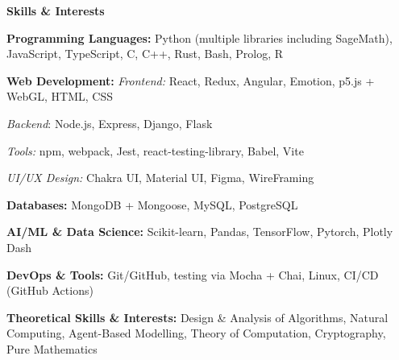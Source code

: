 \documentclass[12pt, a4paper]{article}
\begin{document}
\newpage
\begin{center}
	\large\textbf{Skills \& Interests}
\end{center}

\textbf{Programming Languages:} Python (multiple libraries including SageMath), JavaScript, TypeScript, C, C++, Rust, Bash, Prolog, R

\textbf{Web Development:} \textit{Frontend:} React, Redux, Angular, Emotion, p5.js + WebGL, HTML, CSS

\textit{Backend}: Node.js, Express, Django, Flask

\textit{Tools:} npm, webpack, Jest, react-testing-library, Babel, Vite

\textit{UI/UX Design:} Chakra UI, Material UI, Figma, WireFraming

\textbf{Databases:} MongoDB + Mongoose, MySQL, PostgreSQL

\textbf{AI/ML \& Data Science:} Scikit-learn, Pandas, TensorFlow, Pytorch, Plotly Dash

\textbf{DevOps \& Tools:} Git/GitHub, testing via Mocha + Chai, Linux, CI/CD (GitHub Actions)

\textbf{Theoretical Skills \& Interests:} Design \& Analysis of Algorithms, Natural Computing, Agent-Based Modelling, Theory of Computation, Cryptography, Pure Mathematics
\end{document}
